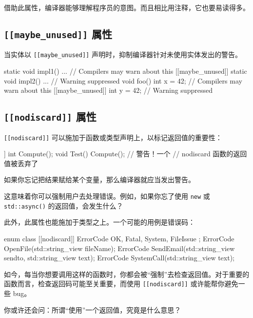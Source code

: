 借助此属性，编译器能够理解程序员的意图。而且相比用注释，它也要易读得多。

\subsection{\texttt{\texttt{[[maybe\_unused]]}} 属性}

当实体以 \texttt{\texttt{\texttt{[[maybe\_unused]]}}} 声明时，抑制编译器针对未使用实体发出的警告。

\begin{codebox}[cpp]
static void impl1() { ... } // Compilers may warn about this
[[maybe_unused]] static void impl2() { ... } // Warning suppressed
void foo() {
int x = 42; // Compilers may warn about this
[[maybe_unused]] int y = 42; // Warning suppressed
}
\end{codebox}

\subsection{\texttt{\texttt{[[nodiscard]]}} 属性}

\texttt{\texttt{\texttt{[[nodiscard]]}}} 可以施加于函数或类型声明上，以标记返回值的重要性：

\begin{codebox}[cpp]
[[nodiscard]] int Compute();
void Test() {
Compute(); // 警告！一个
// nodiscard 函数的返回值被丢弃了
}
\end{codebox}

如果你忘记把结果赋给某个变量，那么编译器就应当发出警告。

这意味着你可以强制用户去处理错误。例如，如果你忘了使用 \texttt{new} 或 \texttt{std::async()} 的返回值，会发生什么？

此外，此属性也能施加于类型之上。一个可能的用例是错误码：

\begin{codebox}[cpp]
enum class [[nodiscard]] ErrorCode {
OK,
Fatal,
System,
FileIssue
};
ErrorCode OpenFile(std::string_view fileName);
ErrorCode SendEmail(std::string_view sendto,
std::string_view text);
ErrorCode SystemCall(std::string_view text);
\end{codebox}

如今，每当你想要调用这样的函数时，你都会被“强制”去检查返回值。对于重要的函数而言，检查返回码可能至关重要，而使用 \texttt{\texttt{\texttt{[[nodiscard]]}}} 或许能帮你避免一些 bug。

你或许还会问：所谓“使用”一个返回值，究竟是什么意思？

